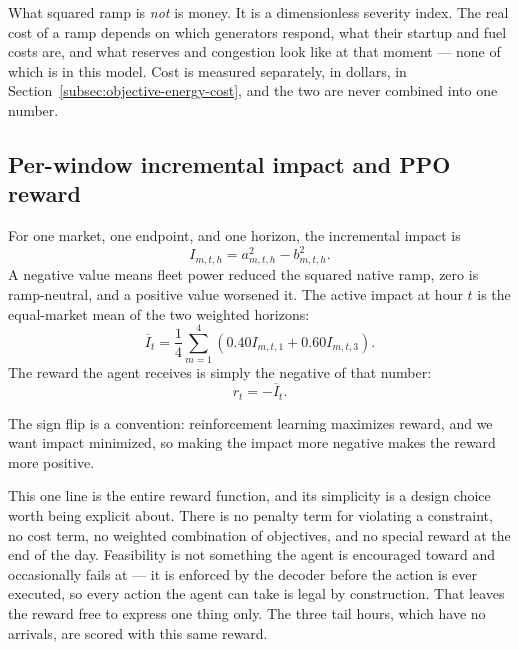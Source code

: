 ﻿\documentclass[12pt]{article}
\begin{document}
What squared ramp is \emph{not} is money. It is a dimensionless severity index.
The real cost of a ramp depends on which generators respond, what their startup
and fuel costs are, and what reserves and congestion look like at that moment ---
none of which is in this model. Cost is measured separately, in dollars, in
Section~\ref{subsec:objective-energy-cost}, and the two are never combined into
one number.

\subsection{Per-window incremental impact and PPO reward}
\label{subsec:objective-incremental-impact}

For one market, one endpoint, and one horizon, the incremental impact is
\begin{equation}
  I_{m,t,h}=a_{m,t,h}^2-b_{m,t,h}^2.
  \label{eq:energy-incremental-impact}
\end{equation}
A negative value means fleet power reduced the squared native ramp, zero is
ramp-neutral, and a positive value worsened it. The active impact at hour
\(t\) is the equal-market mean of the two weighted horizons:
\begin{equation}
  \overline{I}_t=
  \frac{1}{4}\sum_{m=1}^{4}
  \left(0.40I_{m,t,1}+0.60I_{m,t,3}\right).
  \label{eq:objective-primary-impact}
\end{equation}
The reward the agent receives is simply the negative of that number:
\begin{equation}
  r_t=-\overline{I}_t.
  \label{eq:objective-ramp-reward}
\end{equation}

The sign flip is a convention: reinforcement learning maximizes reward, and we
want impact minimized, so making the impact more negative makes the reward more
positive.

This one line is the entire reward function, and its simplicity is a design
choice worth being explicit about. There is no penalty term for violating a
constraint, no cost term, no weighted combination of objectives, and no special
reward at the end of the day. Feasibility is not something the agent is
encouraged toward and occasionally fails at --- it is enforced by the decoder
before the action is ever executed, so every action the agent can take is legal
by construction. That leaves the reward free to express one thing only. The
three tail hours, which have no arrivals, are scored with this same reward.
\end{document}
